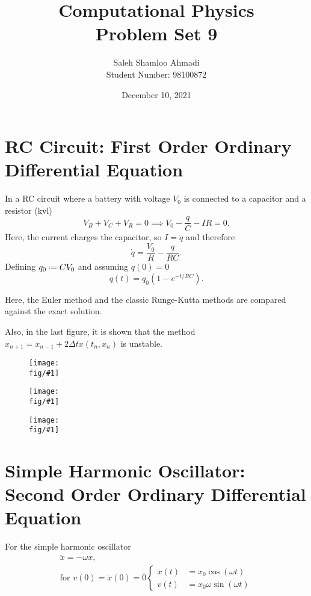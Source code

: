 \documentclass[12pt,a4paper]{article}
\title{Computational Physics\\Problem Set 9}
\author{Saleh Shamloo Ahmadi\\Student Number: 98100872}
\date{December 10, 2021}
\newcommand{\fig}{../fig}
\newcommand{\fighere}[2]{\begin{figure}[htb!]
    \centering
    \texttt{[image: \\fig/\#1]}
\end{figure}}
\newcommand*{\defeq}{\mathrel{\vcenter{\baselineskip0.5ex \lineskiplimit0pt
			\hbox{\scriptsize.}\hbox{\scriptsize.}}}
			=}
\begin{document}
	\maketitle
    \section{RC Circuit: First Order Ordinary Differential Equation}
    In a RC circuit where a battery with voltage $V_0$ is connected to a capacitor and a resistor (kvl)
    \begin{equation}
        V_B + V_C + V_R = 0 \implies V_0 - \frac{q}{C} - IR = 0.
    \end{equation}
    Here, the current charges the capacitor, so $I = \dot{q}$ and therefore
    \begin{equation}
        \dot{q} = \frac{V_0}{R} - \frac{q}{RC}.
    \end{equation}
    Defining $q_0 \defeq CV_0$ and assuming $q(0) = 0$
    \begin{equation}
        q(t) = q_0(1 - e^{-t/RC}).
    \end{equation}
    
    Here, the Euler method and the classic Runge-Kutta methods are compared against the exact solution.

    Also, in the last figure, it is shown that the method $x_{n+1} = x_{n-1} + 2\Delta{t}\dot{x}(t_n, x_n)$
    is unstable.

    \thispagestyle{empty}
    \fighere{rc-sol}{0.86}
    \fighere{rc-error}{1}
    \fighere{rc-unstable}{0.86}
    \restoregeometry
    \section{Simple Harmonic Oscillator:\\Second Order Ordinary Differential Equation}
    For the simple harmonic oscillator
    \begin{gather}
        \ddot{x} = -\omega x, \\
        \text{for $v(0) = \dot{x}(0) = 0$}
        \left\{\begin{aligned}
            x(t) &= x_0\cos(\omega t) \\
            v(t) &= x_0\omega\sin(\omega t)
        \end{aligned}\right.
    \end{gather}
\end{document}
